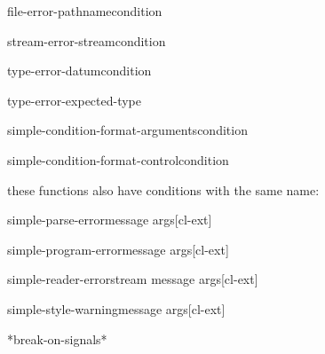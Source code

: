 \documentclass[10pt,english]{book}
\begin{document}
\begin{function}{file-error-pathname}{condition}
  
\end{function}

\begin{function}{stream-error-stream}{condition}
  
\end{function}

\begin{function}{type-error-datum}{condition}
  
\end{function}

\begin{function}{type-error-expected-type}{}
  
\end{function}

\begin{function}{simple-condition-format-arguments}{condition}
  
\end{function}

\begin{function}{simple-condition-format-control}{condition}
  
\end{function}

these functions also have conditions with the same name:

\begin{function}{simple-parse-error}{message \rest args}[cl-ext]
  
\end{function}

\begin{function}{simple-program-error}{message \rest args}[cl-ext]
  
\end{function}

\begin{function}{simple-reader-error}{stream message \rest args}[cl-ext]
  
\end{function}

\begin{function}{simple-style-warning}{message \rest args}[cl-ext]
  
\end{function}

\begin{variable}{*break-on-signals*}{}
  
\end{variable}
\end{document}
